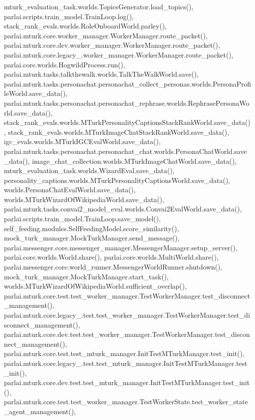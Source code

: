 mturk\+\_\+evaluation\+\_\+task.\+worlds.\+Topics\+Generator.\+load\+\_\+topics(), parlai.\+scripts.\+train\+\_\+model.\+Train\+Loop.\+log(), stack\+\_\+rank\+\_\+evals.\+worlds.\+Role\+Onboard\+World.\+parley(), parlai.\+mturk.\+core.\+worker\+\_\+manager.\+Worker\+Manager.\+route\+\_\+packet(), parlai.\+mturk.\+core.\+dev.\+worker\+\_\+manager.\+Worker\+Manager.\+route\+\_\+packet(), parlai.\+mturk.\+core.\+legacy\+\_.\+worker\+\_\+manager.\+Worker\+Manager.\+route\+\_\+packet(), parlai.\+core.\+worlds.\+Hogwild\+Process.\+run(), parlai.\+mturk.\+tasks.\+talkthewalk.\+worlds.\+Talk\+The\+Walk\+World.\+save(), parlai.\+mturk.\+tasks.\+personachat.\+personachat\+\_\+collect\+\_\+personas.\+worlds.\+Persona\+Profile\+World.\+save\+\_\+data(), parlai.\+mturk.\+tasks.\+personachat.\+personachat\+\_\+rephrase.\+worlds.\+Rephrase\+Persona\+World.\+save\+\_\+data(), stack\+\_\+rank\+\_\+evals.\+worlds.\+M\+Turk\+Personality\+Captions\+Stack\+Rank\+World.\+save\+\_\+data(), stack\+\_\+rank\+\_\+evals.\+worlds.\+M\+Turk\+Image\+Chat\+Stack\+Rank\+World.\+save\+\_\+data(), igc\+\_\+evals.\+worlds.\+M\+Turk\+I\+G\+C\+Eval\+World.\+save\+\_\+data(), parlai.\+mturk.\+tasks.\+personachat.\+personachat\+\_\+chat.\+worlds.\+Persona\+Chat\+World.\+save\+\_\+data(), image\+\_\+chat\+\_\+collection.\+worlds.\+M\+Turk\+Image\+Chat\+World.\+save\+\_\+data(), mturk\+\_\+evaluation\+\_\+task.\+worlds.\+Wizard\+Eval.\+save\+\_\+data(), personality\+\_\+captions.\+worlds.\+M\+Turk\+Personality\+Captions\+World.\+save\+\_\+data(), worlds.\+Persona\+Chat\+Eval\+World.\+save\+\_\+data(), worlds.\+M\+Turk\+Wizard\+Of\+Wikipedia\+World.\+save\+\_\+data(), parlai.\+mturk.\+tasks.\+convai2\+\_\+model\+\_\+eval.\+worlds.\+Convai2\+Eval\+World.\+save\+\_\+data(), parlai.\+scripts.\+train\+\_\+model.\+Train\+Loop.\+save\+\_\+model(), self\+\_\+feeding.\+modules.\+Self\+Feeding\+Model.\+score\+\_\+similarity(), mock\+\_\+turk\+\_\+manager.\+Mock\+Turk\+Manager.\+send\+\_\+message(), parlai.\+messenger.\+core.\+messenger\+\_\+manager.\+Messenger\+Manager.\+setup\+\_\+server(), parlai.\+core.\+worlds.\+World.\+share(), parlai.\+core.\+worlds.\+Multi\+World.\+share(), parlai.\+messenger.\+core.\+world\+\_\+runner.\+Messenger\+World\+Runner.\+shutdown(), mock\+\_\+turk\+\_\+manager.\+Mock\+Turk\+Manager.\+start\+\_\+task(), worlds.\+M\+Turk\+Wizard\+Of\+Wikipedia\+World.\+sufficient\+\_\+overlap(), parlai.\+mturk.\+core.\+test.\+test\+\_\+worker\+\_\+manager.\+Test\+Worker\+Manager.\+test\+\_\+disconnect\+\_\+management(), parlai.\+mturk.\+core.\+legacy\+\_.\+test.\+test\+\_\+worker\+\_\+manager.\+Test\+Worker\+Manager.\+test\+\_\+disconnect\+\_\+management(), parlai.\+mturk.\+core.\+dev.\+test.\+test\+\_\+worker\+\_\+manager.\+Test\+Worker\+Manager.\+test\+\_\+disconnect\+\_\+management(), parlai.\+mturk.\+core.\+test.\+test\+\_\+mturk\+\_\+manager.\+Init\+Test\+M\+Turk\+Manager.\+test\+\_\+init(), parlai.\+mturk.\+core.\+legacy\+\_.\+test.\+test\+\_\+mturk\+\_\+manager.\+Init\+Test\+M\+Turk\+Manager.\+test\+\_\+init(), parlai.\+mturk.\+core.\+dev.\+test.\+test\+\_\+mturk\+\_\+manager.\+Init\+Test\+M\+Turk\+Manager.\+test\+\_\+init(), parlai.\+mturk.\+core.\+test.\+test\+\_\+worker\+\_\+manager.\+Test\+Worker\+State.\+test\+\_\+worker\+\_\+state\+\_\+agent\+\_\+management(), 